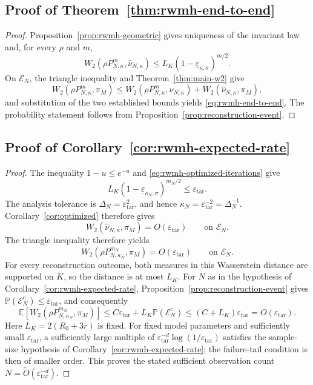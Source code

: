 \documentclass{article}
\newcommand{\Pp}{\mathbb P}
\newcommand{\E}{\mathbb E}
\newcommand{\cE}{\mathcal E}
\newcommand{\whatnu}{\widehat\nu_{N,\kappa}}
\numberwithin{equation}{section}
\newcommand{\eps}{\varepsilon}
\renewcommand{\epsilon}{\eps}
\begin{document}
\subsection{Proof of Theorem~\ref{thm:rwmh-end-to-end}}



\begin{proof}
Proposition~\ref{prop:rwmh-geometric} gives uniqueness of the invariant
law and, for every $\rho$ and $m$,
\[
 W_2(\rho P_{N,\kappa}^m,\whatnu)
 \le L_K(1-\underline\varepsilon_{\kappa,\sigma})^{m/2}.
\]
On $\cE_N$, the triangle inequality and Theorem~\ref{thm:main-w2} give
\[
 W_2(\rho P_{N,\kappa}^m,\pi_M)
 \le W_2(\rho P_{N,\kappa}^m,\whatnu)
    +W_2(\whatnu,\pi_M),
\]
and substitution of the two established bounds yields
\eqref{eq:rwmh-end-to-end}. The probability statement follows from
Proposition~\ref{prop:reconstruction-event}.
\end{proof}



\subsection{Proof of Corollary~\ref{cor:rwmh-expected-rate}}



\begin{proof}
The inequality $1-u\le e^{-u}$ and
\eqref{eq:rwmh-optimized-iterations} give
\[
 L_K(1-\underline\varepsilon_{\kappa_N,\sigma})^{m_N/2}
 \le\epsilon_{\mathrm{tar}}.
\]
The analysis tolerance is $\Delta_N=\epsilon_{\mathrm{tar}}^2$, and hence
$\kappa_N=\epsilon_{\mathrm{tar}}^{-2}=\Delta_N^{-1}$.
Corollary~\ref{cor:optimized} therefore gives
\[
 W_2(\whatnu,\pi_M)=O(\epsilon_{\mathrm{tar}})
 \qquad\text{on }\cE_N.
\]
The triangle inequality therefore yields
\[
 W_2(\rho P_{N,\kappa_N}^{m_N},\pi_M)
 =O(\epsilon_{\mathrm{tar}})
 \qquad\text{on }\cE_N.
\]
For every reconstruction outcome, both measures in this Wasserstein
distance are supported on $K$, so the distance is at most $L_K$.
For $N$ as in the hypothesis of Corollary~\ref{cor:rwmh-expected-rate},
Proposition~\ref{prop:reconstruction-event} gives
$\Pp(\cE_N^c)\le\epsilon_{\mathrm{tar}}$, and consequently
\[
 \E\left[
 W_2(\rho P_{N,\kappa_N}^{m_N},\pi_M)
 \right]
 \le C\epsilon_{\mathrm{tar}}
   +L_K\Pp(\cE_N^c)
 \le(C+L_K)\epsilon_{\mathrm{tar}}
 =O(\epsilon_{\mathrm{tar}}).
\]
Here $L_K=2(R_0+3r)$ is fixed. For fixed model parameters and sufficiently
small $\epsilon_{\mathrm{tar}}$, a sufficiently large multiple of
$\epsilon_{\mathrm{tar}}^{-d}\log(1/\epsilon_{\mathrm{tar}})$ satisfies
the sample-size hypothesis of Corollary~\ref{cor:rwmh-expected-rate}; the
failure-tail condition is then of smaller order. This proves the stated
sufficient observation count $N=\widetilde O(\epsilon_{\mathrm{tar}}^{-d})$.
\end{proof}
\end{document}
